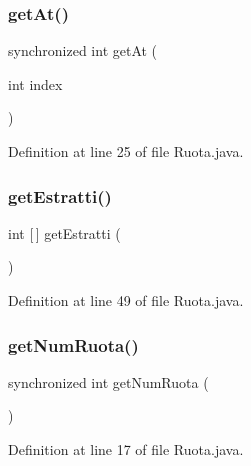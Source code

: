 \subsubsection{\texorpdfstring{get\+At()}{getAt()}}
{\footnotesize\ttfamily synchronized int get\+At (\begin{DoxyParamCaption}\item[{int}]{index }\end{DoxyParamCaption})}



Definition at line 25 of file Ruota.\+java.

\mbox{\label{classmain_1_1_ruota_a0dee4d8069c9f083fac5bd060b9ae872}} 
\subsubsection{\texorpdfstring{get\+Estratti()}{getEstratti()}}
{\footnotesize\ttfamily int \mbox{[}$\,$\mbox{]} get\+Estratti (\begin{DoxyParamCaption}{ }\end{DoxyParamCaption})}



Definition at line 49 of file Ruota.\+java.

\mbox{\label{classmain_1_1_ruota_a42fe6d0ed82bf794b0956983a6b5f8b2}} 
\subsubsection{\texorpdfstring{get\+Num\+Ruota()}{getNumRuota()}}
{\footnotesize\ttfamily synchronized int get\+Num\+Ruota (\begin{DoxyParamCaption}{ }\end{DoxyParamCaption})}



Definition at line 17 of file Ruota.\+java.

\mbox{\label{classmain_1_1_ruota_aed75271bb2c21c3cb7e838a2cdc1898a}} 
